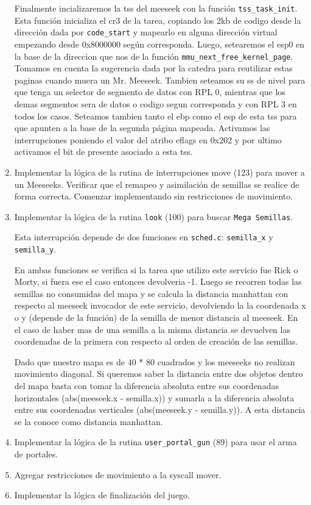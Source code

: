 \documentclass[a4paper]{article}
\begin{document}
\begin{enumerate}
	Finalmente incializaremos la tss del meeseek con la funci\'on \texttt{tss\_task\_init}. Esta funci\'on inicializa el cr3 de la tarea, copiando los 2kb de codigo desde la direcci\'on dada por \texttt{code\_start} y mapearlo en alguna direcci\'on virtual empezando desde 0x8000000 seg\'un corresponda. Luego, setearemos el esp0 en la base de la direccion que nos de la funci\'on \texttt{mmu\_next\_free\_kernel\_page}. Tomamos en cuenta la sugerencia dada por la catedra para reutilizar estas paginas cuando muera un Mr. Meeseek. Tambien seteamos su ss de nivel para que tenga un selector de segmento de datos con RPL 0, mientras que los demas segmentos sera de datos o codigo segun corresponda y con RPL 3 en todos los casos. Seteamos tambien tanto el ebp como el esp de esta tss para que apunten a la base de la segunda p\'agina mapeada. Activamos las interrupciones poniendo el valor del atribo eflags en 0x202 y por ultimo activamos el bit de presente asociado a esta tss.
	
	\item Implementar la lógica de la rutina de interrupciones move (123) para mover a un Meeseeks. Verificar que el remapeo y asimilación de semillas se realice de forma correcta. Comenzar implementando sin restricciones de movimiento.
	
	\item Implementar la lógica de la rutina \texttt{look} (100) para buscar \texttt{Mega Semillas}.
	
	Esta interrupción depende de dos funciones en \texttt{sched.c}: \texttt{semilla\_x} y \texttt{semilla\_y}.
	
	En ambas funciones se verifica si la tarea que utilizo este servicio fue Rick o Morty, si fuera ese el caso entonces devolveria -1. Luego se recorren todas las semillas no consumidas del mapa y se calcula la distancia manhattan con respecto al meeseek invocador de este servicio, devolviendo la la coordenada x o y (depende de la funci\'on) de la semilla de menor distancia al meeseek.
	En el caso de haber mas de una semilla a la misma distancia se devuelven las coordenadas de la primera con respecto al orden de creación de las semillas.
	
	Dado que nuestro mapa es de 40 * 80 cuadrados y los meeseeks no realizan movimiento diagonal. Si queremos saber la distancia entre dos objetos dentro del mapa basta con tomar la diferencia absoluta entre sus coordenadas horizontales (abs(meeseek.x - semilla.x)) y sumarla a la diferencia absoluta entre sus coordenadas verticales (abs(meeseek.y - semilla.y)). A esta distancia se la conoce como distancia manhattan.
	
	\item Implementar la lógica de la rutina \texttt{user\_portal\_gun} (89) para usar el arma de portales.
	
	\item Agregar restricciones de movimiento a la syscall mover.
	
	\item Implementar la lógica de finalización del juego.
	
\end{enumerate}
\end{document}
